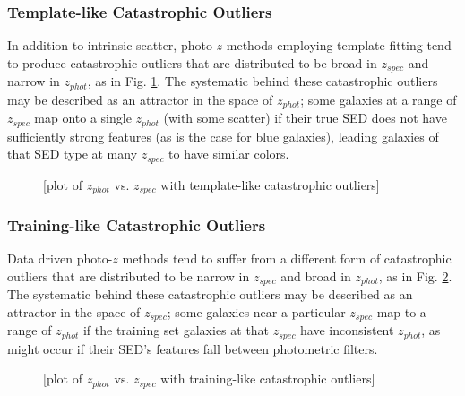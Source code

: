 \documentclass[iop]{emulateapj}
\begin{document}
\subsubsection{Template-like Catastrophic Outliers}
\label{sec:tempcatout}

In addition to intrinsic scatter, photo-$z$ methods employing template fitting 
tend to produce catastrophic outliers that are distributed to be broad in 
$z_{spec}$ and narrow in $z_{phot}$, as in Fig. \ref{fig:tempcatout}.  The 
systematic behind these catastrophic outliers may be described as an attractor 
in the space of $z_{phot}$; some galaxies at a range of $z_{spec}$ map onto a 
single $z_{phot}$ (with some scatter) if their true SED does not have 
sufficiently strong features (as is the case for blue galaxies), leading 
galaxies of that SED type at many $z_{spec}$ to have similar colors.

\begin{figure}
	\begin{center}
		\caption{[plot of $z_{phot}$ vs. $z_{spec}$ with template-like 
catastrophic outliers]}
		\label{fig:tempcatout}
	\end{center}
\end{figure}

\subsubsection{Training-like Catastrophic Outliers}
\label{sec:traincatout}

Data driven photo-$z$ methods tend to suffer from a different form of 
catastrophic outliers that are distributed to be narrow in $z_{spec}$ and broad 
in $z_{phot}$, as in Fig. \ref{fig:traincatout}.  The systematic behind these 
catastrophic outliers may be described as an attractor in the space of 
$z_{spec}$; some galaxies near a particular $z_{spec}$ map to a range of 
$z_{phot}$ if the training set galaxies at that $z_{spec}$ have inconsistent 
$z_{phot}$, as might occur if their SED's features fall between photometric 
filters.

\begin{figure}
	\begin{center}
		\caption{[plot of $z_{phot}$ vs. $z_{spec}$ with training-like 
catastrophic outliers]}
		\label{fig:traincatout}
	\end{center}
\end{figure}
\end{document}
